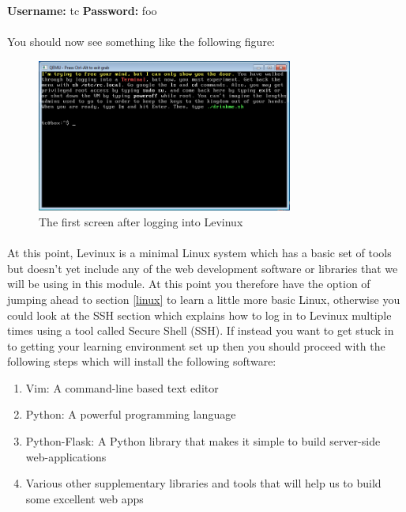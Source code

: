 \documentclass[12pt, a4paper, twoside]{book}
\newcommand{\blank}[1]{\hspace*{#1}}
\begin{document}
\begin{framed}
    \textbf{Username:} tc\blank{2cm} \textbf{Password:} foo
\end{framed}

\paragraph{} You should now see something like the following figure:

\begin{figure}[H]
\centering
\includegraphics[width=0.75\textwidth]{images/levinux_loggedin.png}
\caption{The first screen after logging into Levinux}
\label{fig:levinux-logged-in}
\end{figure}

\paragraph{} At this point, Levinux is a minimal Linux system which has a basic set of tools but doesn't yet include any of the web development software or libraries that we will be using in this module. At this point you therefore have the option of jumping ahead to section \ref{linux} to learn a little more basic Linux, otherwise you could look at the SSH section which explains how to log in to Levinux multiple times using a tool called Secure Shell (SSH). If instead you want to get stuck in to getting your learning environment set up then you should proceed with the following steps which will install the following software:
\begin{enumerate}
\item Vim: A command-line based text editor
\item Python: A powerful programming language
\item Python-Flask: A Python library that makes it simple to build server-side web-applications
\item Various other supplementary libraries and tools that will help us to build some excellent web apps
\end{enumerate}
\end{document}
